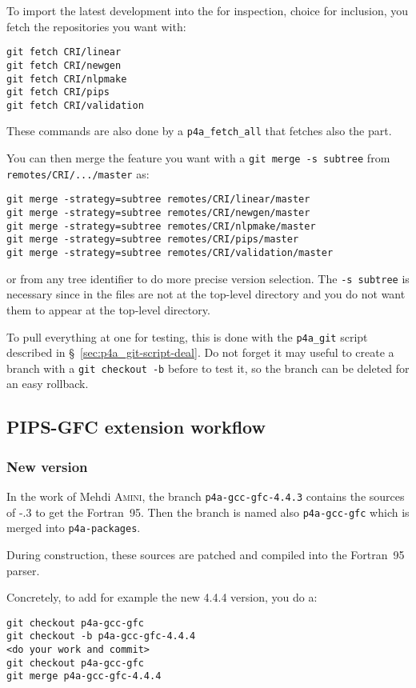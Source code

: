\documentclass[a4paper]{article}
\begin{document}
To import the latest \Apips development into the \Apfa{} \Agit for
inspection, choice for inclusion, you fetch the repositories you want
with:
\begin{verbatim}
git fetch CRI/linear
git fetch CRI/newgen
git fetch CRI/nlpmake
git fetch CRI/pips
git fetch CRI/validation
\end{verbatim}
These commands are also done by a \verb|p4a_fetch_all| that fetches also the
\Apolylib part.

You can then merge the feature you want with a \texttt{git merge -s
  subtree} from \texttt{remotes/CRI/.../master} as:
\begin{verbatim}
git merge -strategy=subtree remotes/CRI/linear/master
git merge -strategy=subtree remotes/CRI/newgen/master
git merge -strategy=subtree remotes/CRI/nlpmake/master
git merge -strategy=subtree remotes/CRI/pips/master
git merge -strategy=subtree remotes/CRI/validation/master
\end{verbatim}
or from any tree identifier to do more precise version selection. The
\texttt{-s subtree} is necessary since in \Apfa the \Apips files are not
at the top-level directory and you do not want them to appear at the
top-level directory.

To pull everything at one for testing, this is done with the
\verb|p4a_git| script described in \S~\ref{sec:p4a_git-script-deal}. Do
not forget it may useful to create a branch with a \texttt{git checkout
  -b} before to test it, so the branch can be deleted for an easy
rollback.


\subsection{PIPS-GFC extension workflow}
\label{sec:pips-gfc-workflow}

\subsubsection{New version}
\label{sec:new-version}

In the work of Mehdi \textsc{Amini}, the branch
\texttt{p4a-gcc-gfc-4.4.3} contains the sources of \Agcc-.3 to
get the Fortran~95. Then the branch is named also \texttt{p4a-gcc-gfc}
which is merged into \texttt{p4a-packages}.

During \Apfa construction, these sources are patched and compiled into the
\Apips Fortran~95 parser.

Concretely, to add for example the new 4.4.4 version, you do a:
\begin{verbatim}
git checkout p4a-gcc-gfc
git checkout -b p4a-gcc-gfc-4.4.4
<do your work and commit>
git checkout p4a-gcc-gfc
git merge p4a-gcc-gfc-4.4.4
\end{verbatim}
\end{document}
